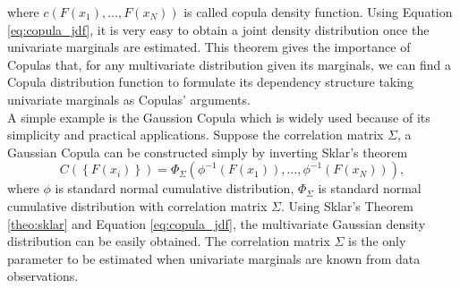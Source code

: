 \documentclass{article}
\begin{document}
where $c\left(F\left(x_1\right),\ldots, F\left(x_N\right)\right)$ is called copula density function. Using Equation \ref{eq:copula_jdf}, it is very easy to obtain a joint density distribution once the univariate marginals are estimated.
This theorem gives the importance of Copulas that, for any multivariate distribution given its marginals, we can find a Copula distribution function to formulate its dependency structure taking univariate marginals as Copulas' arguments. \\
A simple example is the Gaussion Copula which is widely used because of its simplicity and practical applications. Suppose the correlation matrix $\Sigma$, a Gaussian Copula can be constructed simply by inverting Sklar's theorem \cite{Sklar59}
\begin{equation}
C\left(\left\lbrace F\left(x_i\right)\right\rbrace\right) = \Phi_\Sigma\left(\phi^{-1}\left(F\left(x_1\right)\right),\ldots, \phi^{-1}\left(F\left(x_N\right)\right)\right),
\end{equation}
where $\phi$ is standard normal cumulative distribution, $\Phi_\Sigma$ is standard normal cumulative distribution with correlation matrix $\Sigma$. Using Sklar's Theorem \ref{theo:sklar} and Equation \ref{eq:copula_jdf}, the multivariate Gaussian density distribution can be easily obtained. The correlation matrix $\Sigma$ is the only parameter to be estimated when univariate marginals are known from data observations. 
\end{document}
